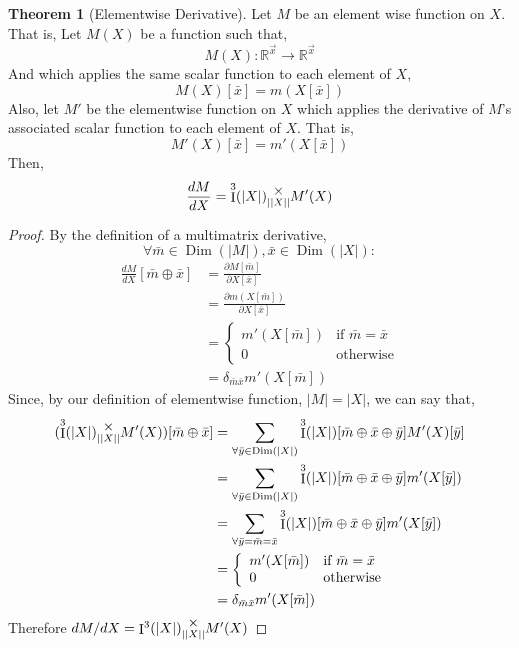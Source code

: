 \documentclass[12pt]{article}
\theoremstyle{definition}
\newtheorem{theorem}{Theorem}[section]
\theoremstyle{case}
\theoremstyle{ppart}
\DeclareMathOperator{\Dim}{Dim}
\DeclareMathOperator{\Ident}{I}
\newcommand{\mmult}[1]{\text{\raisebox{1ex}{$\underset{#1}{\times}$}}}
\begin{document}
\begin{theorem}[Elementwise Derivative]
Let $M$ be an element wise function on $X$. That is, Let $M(X)$ be a function
such that,
\[ M(X) : \mathbb{R}^{\vec{x}} \to \mathbb{R}^{\vec{x}} \]
And which applies the same scalar function to each element of $X$, 
\[ M(X)[\bar{x}] = m(X[\bar{x}]) \]
Also, let $M'$ be the elementwise function on $X$ which applies the derivative
of $M$'s associated scalar function to each element of $X$. That is,
\[ M'(X)[\bar{x}] = m'(X[\bar{x}]) \]
Then,
\[ \frac{dM}{dX} = \Ident^3(|X|) \mmult{||X||} M'(X) \]
\end{theorem}
\begin{proof}
By the definition of a multimatrix derivative,
\[ \forall \bar{m} \in \Dim(|M|), \bar{x} \in \Dim(|X|) : \]
\begin{align*}
 \frac{dM}{dX}[\bar{m} \oplus \bar{x}]
 &= \frac{\partial M[\bar{m}]}{\partial X[\bar{x}]} \\
 &= \frac{\partial m(X[\bar{m}])}{\partial X[\bar{x}]} \\
 &= \left\{
	\begin{array}{ll}
		m'(X[\bar{m}]) & \mbox{if } \bar{m} = \bar{x} \\
		0 & \mbox{otherwise}
	\end{array}
 \right. \\
 &= \delta_{\bar{m} \bar{x}} m'(X[\bar{m}])
\end{align*}
Since, by our definition of elementwise function, $|M| = |X|$, we can
say that, 
\begin{align*}
 (\Ident^3(|X|) \mmult{||X||} M'(X))[\bar{m} \oplus \bar{x}]
 &= \sum_{\forall \bar{y} \in \Dim(|X|)}
 \Ident^3(|X|)[\bar{m} \oplus \bar{x} \oplus \bar{y}] M'(X)[\bar{y}] \\
 &= \sum_{\forall \bar{y} \in \Dim(|X|)}
 \Ident^3(|X|)[\bar{m} \oplus \bar{x} \oplus \bar{y}] m'(X[\bar{y}]) \\
 &= \sum_{\forall \bar{y} = \bar{m} = \bar{x}}
 \Ident^3(|X|)[\bar{m} \oplus \bar{x} \oplus \bar{y}] m'(X[\bar{y}]) \\
 &= \left\{
	\begin{array}{ll}
		m'(X[\bar{m}]) & \mbox{if } \bar{m} = \bar{x} \\
		0 & \mbox{otherwise}
	\end{array}
 \right. \\
 &= \delta_{\bar{m} \bar{x}} m'(X[\bar{m}])
\end{align*}
Therefore $dM/dX = \Ident^3(|X|) \mmult{||X||} M'(X)$
\end{proof}
\end{document}

